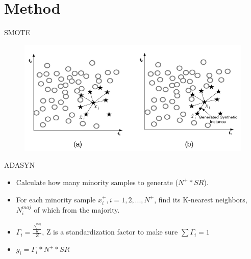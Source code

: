 \documentclass[10pt]{beamer}
\begin{document}



\section{Method}

\begin{frame}{SMOTE}
\begin{figure}[!ht]
\centering
  \includegraphics[width=\linewidth]{smote}
\end{figure}
\end{frame}


\begin{frame}{ADASYN}
 \begin{itemize}
  \item Calculate how many minority samples to generate ($N^{+}*SR$).
  \item For each minority sample $x^{+}_{i},i=1,2,...,N^{+}$, find its K-nearest neighbors, $N_{i}^{maj}$ of which from the majority.
  \item $\Gamma_{i}=\frac{\frac{N_{i}^{maj}}{K}}{Z}$, Z is a standardization factor to make sure $\sum \Gamma _{i}=1$
  \item $g_{i}=\Gamma _{i}*N^{+}*SR$
 \end{itemize}
 \end{frame}
\end{document}
